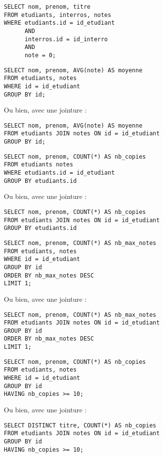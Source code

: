 \begin{lstlisting}
SELECT nom, prenom, titre
FROM etudiants, interros, notes
WHERE etudiants.id = id_etudiant
      AND
      interros.id = id_interro
      AND 
      note = 0;
\end{lstlisting}

\medskip{}  
  
\question{}
\begin{lstlisting}
SELECT nom, prenom, AVG(note) AS moyenne
FROM etudiants, notes
WHERE id = id_etudiant
GROUP BY id;
\end{lstlisting}
Ou bien, avec une jointure : 
\begin{lstlisting}
SELECT nom, prenom, AVG(note) AS moyenne
FROM etudiants JOIN notes ON id = id_etudiant
GROUP BY id;
\end{lstlisting}

\medskip{}

\question{}
\begin{lstlisting}
SELECT nom, prenom, COUNT(*) AS nb_copies
FROM etudiants notes
WHERE etudiants.id = id_etudiant
GROUP BY etudiants.id
\end{lstlisting}
Ou bien, avec une jointure : 
\begin{lstlisting}
SELECT nom, prenom, COUNT(*) AS nb_copies
FROM etudiants JOIN notes ON id = id_etudiant
GROUP BY etudiants.id
\end{lstlisting}

\medskip{}  
  
\question{}
\begin{lstlisting}
SELECT nom, prenom, COUNT(*) AS nb_max_notes
FROM etudiants, notes
WHERE id = id_etudiant
GROUP BY id
ORDER BY nb_max_notes DESC
LIMIT 1;
\end{lstlisting}
Ou bien, avec une jointure : 
\begin{lstlisting}
SELECT nom, prenom, COUNT(*) AS nb_max_notes
FROM etudiants JOIN notes ON id = id_etudiant
GROUP BY id
ORDER BY nb_max_notes DESC
LIMIT 1;
\end{lstlisting}

\medskip{}  
  
\question{}
\begin{lstlisting}
SELECT nom, prenom, COUNT(*) AS nb_copies
FROM etudiants, notes
WHERE id = id_etudiant
GROUP BY id
HAVING nb_copies >= 10;
\end{lstlisting}
Ou bien, avec une jointure : 
\begin{lstlisting}
SELECT DISTINCT titre, COUNT(*) AS nb_copies
FROM etudiants JOIN notes ON id = id_etudiant
GROUP BY id
HAVING nb_copies >= 10;
\end{lstlisting}


